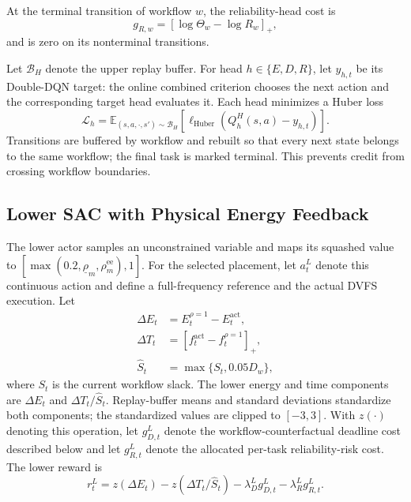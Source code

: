 \documentclass[lettersize,journal]{IEEEtran}
\begin{document}
At the terminal transition of workflow $w$, the reliability-head cost is
\begin{equation}
 g_{R,w}=\left[\log\Theta_w-\log R_w\right]_+,
 \label{eq:high_reliability_cost}
\end{equation}
and is zero on its nonterminal transitions.

Let $\mathcal{B}_H$ denote the upper replay buffer. For head
$h\in\{E,D,R\}$, let $y_{h,t}$ be its Double-DQN target: the online
combined criterion chooses the next action and the corresponding target head
evaluates it. Each head minimizes a Huber loss
\begin{equation}
 \mathcal{L}_h=\mathbb{E}_{(s,a,\cdot,s')\sim\mathcal{B}_H}
 \left[\ell_{\mathrm{Huber}}(Q_h^H(s,a)-y_{h,t})\right].
 \label{eq:high_loss}
\end{equation}
Transitions are buffered by workflow and rebuilt so that every next state
belongs to the same workflow; the final task is marked terminal. This prevents
credit from crossing workflow boundaries.

\subsection{Lower SAC with Physical Energy Feedback}
The lower actor samples an unconstrained variable and maps its squashed value
to $[\max(0.2,\underline\rho_m,\rho_m^{\mathrm{ee}}),1]$. For the selected
placement, let $a_t^L$ denote this continuous action and define a full-frequency
reference and the actual DVFS execution.
Let
\begin{align}
 \Delta E_t&=E_t^{\rho=1}-E_t^{\mathrm{act}},\\
 \Delta T_t&=[f_t^{\mathrm{act}}-f_t^{\rho=1}]_+,\\
 \widehat S_t&=\max\{S_t,0.05D_w\},
\end{align}
where $S_t$ is the current workflow slack. The lower energy and time components
are $\Delta E_t$ and $\Delta T_t/\widehat S_t$. Replay-buffer means and standard
deviations standardize both components; the standardized values are clipped to
$[-3,3]$. With $z(\cdot)$ denoting this operation, let $g_{D,t}^L$ denote the
workflow-counterfactual deadline cost described below and let $g_{R,t}^L$
denote the allocated per-task reliability-risk cost. The lower reward is
\begin{equation}
 r_t^L=z(\Delta E_t)-z(\Delta T_t/\widehat S_t)
 -\lambda_D^L g_{D,t}^L-\lambda_R^L g_{R,t}^L.
 \label{eq:low_reward}
\end{equation}
\end{document}
